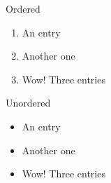 \documentclass{article}
\begin{document}
Ordered %
\begin{enumerate}
	\item An entry
	\item Another one
	\item Wow! Three entries
\end{enumerate}

Unordered %
\begin{itemize}
	\item An entry
	\item Another one
	\item Wow! Three entries
\end{itemize}
\end{document}
